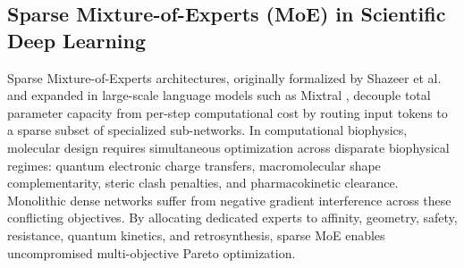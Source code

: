 \subsection{Sparse Mixture-of-Experts (MoE) in Scientific Deep Learning}
Sparse Mixture-of-Experts architectures, originally formalized by Shazeer et al.\ \cite{shazeer2017outrageously} and expanded in large-scale language models such as Mixtral \cite{jiang2024mixtral}, decouple total parameter capacity from per-step computational cost by routing input tokens to a sparse subset of specialized sub-networks. In computational biophysics, molecular design requires simultaneous optimization across disparate biophysical regimes: quantum electronic charge transfers, macromolecular shape complementarity, steric clash penalties, and pharmacokinetic clearance. Monolithic dense networks suffer from negative gradient interference across these conflicting objectives. By allocating dedicated experts to affinity, geometry, safety, resistance, quantum kinetics, and retrosynthesis, sparse MoE enables uncompromised multi-objective Pareto optimization.


